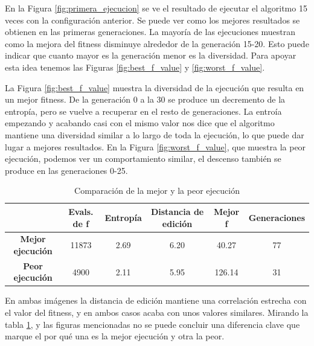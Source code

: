 En la Figura \ref{fig:primera_ejecucion} se ve el resultado de ejecutar el algoritmo 15 veces con la configuración anterior.
Se puede ver como los mejores resultados se obtienen en las primeras generaciones. La mayoría de las ejecuciones muestran como la mejora
del fitness disminuye alrededor de la generación 15-20. Esto puede indicar que cuanto mayor es la generación menor es la diversidad. 
Para apoyar esta idea tenemos las Figuras \ref{fig:best_f_value} y \ref{fig:worst_f_value}. 

La Figura \ref{fig:best_f_value} muestra la diversidad de la ejecución que resulta en un mejor fitness. De la generación 0 a la 30 se produce un decremento de la entropía,
pero se vuelve a recuperar en el resto de generaciones. La entroía empezando y acabando casi con el mismo valor nos dice que el algoritmo mantiene una diversidad similar a 
lo largo de toda la ejecución, lo que puede dar lugar a mejores resultados. En la Figura \ref{fig:worst_f_value}, que muestra la peor ejecución, podemos 
ver un comportamiento similar, el descenso también se produce en las generaciones 0-25. 

\begin{table}[]
    \begin{tabular}{||c|c|c|c|c|c||}
    \hline
                             & \textbf{Evals. de f} & \textbf{Entropía} & \textbf{Distancia de edición} & \textbf{Mejor f} & \textbf{Generaciones} \\ \hline
    \textbf{Mejor ejecución} & 11873                      & 2.69              & 6.20                          & 40.27                     & 77                    \\ \hline
    \textbf{Peor ejecución}  & 4900                       & 2.11              & 5.95                          & 126.14                    & 31                    \\ \hline
    \end{tabular}
    \caption{Comparación de la mejor y la peor ejecución}
    \label{fig:Comparación}
\end{table}

En ambas imágenes la distancia de edición mantiene una correlación estrecha con el valor del fitness, y en ambos casos acaba con unos valores similares. Mirando la tabla \ref{fig:Comparación}, y las figuras
mencionadas no se puede concluir una diferencia clave que marque el por qué una es la mejor ejecución y otra la peor.

